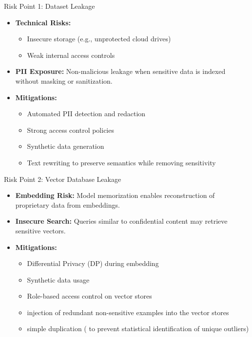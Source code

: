\documentclass[aspectratio=169,xcolor=dvipsnames]{beamer}
\begin{document}
	\begin{frame}{Risk Point 1: Dataset Leakage}
		
		\begin{itemize}
			\item \textbf{Technical Risks:}
			\begin{itemize}
				\item Insecure storage (e.g., unprotected cloud drives)
				\item Weak internal access controls
			\end{itemize}
			
			\item \textbf{PII Exposure:} Non-malicious leakage when sensitive data is indexed without masking or sanitization.
			
			\item \textbf{Mitigations:}
			\begin{itemize}
				\item Automated PII detection and redaction
				\item Strong access control policies
				\item Synthetic data generation
				\item Text rewriting to preserve semantics while removing sensitivity
			\end{itemize}
		\end{itemize}
		
	\end{frame}
	
	\begin{frame}{Risk Point 2: Vector Database Leakage}
		
		\begin{itemize}
			\item \textbf{Embedding Risk:} Model memorization enables reconstruction of proprietary data from embeddings.
			
			\item \textbf{Insecure Search:} Queries similar to confidential content may retrieve sensitive vectors.
			
			\item \textbf{Mitigations:}
			\begin{itemize}
				\item Differential Privacy (DP) during embedding
				\item Synthetic data usage
				\item Role-based access control on vector stores
				\item injection of redundant non-sensitive examples into the vector stores
				\item simple duplication ( to prevent statistical identification of unique outliers)
			\end{itemize}
		\end{itemize}
		
	\end{frame}
	
\end{document}
